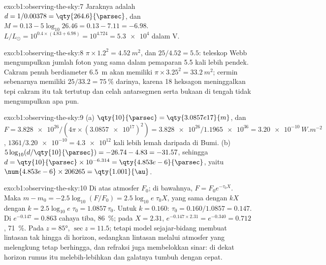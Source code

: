 \begin{solution}{exo:b1:observing-the-sky:7}
Jaraknya adalah $d = 1/0.00378 = \qty{264.6}{\parsec}$, dan  $M = 0.13 - 5\log_{10}26.46 = 0.13 - 7.11 = -6.98$. $L/L_\odot = 10^{0.4\times(4.83 + 6.98)} =
10^{4.724} = \num{5.3e4}$ dalam V.
\end{solution}

\begin{solution}{exo:b1:observing-the-sky:8}
$\pi\times1.2^2 = \qty{4.52}{m^2}$, dan $25/4.52 = 5.5$: teleskop Webb mengumpulkan jumlah foton yang sama dalam pemaparan 5.5 kali lebih pendek. Cakram penuh berdiameter \qty{6.5}{m} akan memiliki $\pi\times3.25^2 = \qty{33.2}{m^2}$; cermin sebenarnya memiliki $25/33.2 = \qty{75}{\percent}$ darinya, karena 18 heksagon meninggalkan tepi cakram itu tak tertutup dan celah antarsegmen serta bukaan di tengah tidak mengumpulkan apa pun.
\end{solution}

\begin{solution}{exo:b1:observing-the-sky:9}
(a) $\qty{10}{\parsec} = \qty{3.0857e17}{m}$, dan $F = \num{3.828e26}/(4\pi
\times(\num{3.0857e17})^2) = \num{3.828e26}/\num{1.1965e36} =
\qty{3.20e-10}{W.m^{-2}}$, $1361/\num{3.20e-10} = \num{4.3e12}$ kali lebih lemah daripada di Bumi.
(b) $5\log_{10}(d/\qty{10}{\parsec}) = -26.74 - 4.83 = -31.57$, sehingga
$d = \qty{10}{\parsec}\times10^{-6.314} = \qty{4.853e-6}{\parsec}$, yaitu
$\num{4.853e-6}\times206265 = \qty{1.001}{\au}$.
\end{solution}

\begin{solution}{exo:b1:observing-the-sky:10}
Di atas atmosfer  $F_0$; di bawahnya, $F = F_0e^{-\tau_0X}$. Maka
$m - m_0 = -2.5\log_{10}(F/F_0) = 2.5\log_{10}e\;\tau_0X$, yang sama dengan $kX$ dengan
$k = 2.5\log_{10}e\;\tau_0 = 1.0857\,\tau_0$. Untuk $k = 0.160$:
$\tau_0 = 0.160/1.0857 = 0.147$. Di  $e^{-0.147} = 0.863$ cahaya tiba, \qty{86}{\percent}; pada $X = 2.31$, $e^{-0.147\times2.31} =
e^{-0.340} = 0.712$, \qty{71}{\percent}. Pada $z = \ang{85}$, $\sec z =
11.5$; tetapi model sejajar-bidang membuat lintasan tak hingga di horizon,
sedangkan lintasan melalui atmosfer yang melengkung tetap berhingga, dan refraksi juga membelokkan sinar: di dekat horizon rumus itu melebih-lebihkan  dan galatnya tumbuh dengan cepat.
\end{solution}

